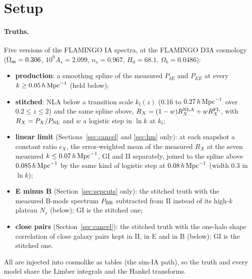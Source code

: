 \documentclass[11pt]{article}
\newcommand{\hMpc}{\,h\,{\rm Mpc}^{-1}}
\newcommand{\PNL}{P_{\rm NL}}
\newcommand{\PdE}{P_{\delta E}}
\newcommand{\PEE}{P_{EE}}
\newcommand{\Om}{\Omega_{\rm m}}
\begin{document}
\section{Setup}
\label{sec:setup}

\paragraph{Truths.}
Five versions of the FLAMINGO IA spectra, at the FLAMINGO D3A cosmology
($\Om = 0.306$, $10^9 A_s = 2.099$, $n_s = 0.967$, $H_0 = 68.1$, $\Omega_b =
0.0486$):
\begin{itemize}
  \item \textbf{production}: a smoothing spline of the measured $\PdE$ and
    $\PEE$ at every $k \ge 0.05\hMpc$ (held below);
  \item \textbf{stitched}: NLA below a transition scale $k_t(z)$ (0.16 to
    $0.27\hMpc$ over $0.2 \le z \le 2$) and the same spline above,
    $R_X = (1 - w) R_X^{\rm NLA} + w R_X^{\rm FL}$, with $R_X = P_X/\PNL$ and
    $w$ a logistic step in $\ln k$ at $k_t$;
  \item \textbf{linear limit} (Sections~\ref{sec:cancel} and \ref{sec:hm}
    only): at each snapshot a constant ratio $c_X$, the error-weighted mean
    of the measured $R_X$ at the seven measured $k \le 0.07\hMpc$, GI and II
    separately, joined to the spline above $0.085\hMpc$ by the same kind of
    logistic step at $0.08\hMpc$ (width 0.3 in $\ln k$);
  \item \textbf{E minus B} (Section~\ref{sec:sepcuts} only): the stitched
    truth with the measured B-mode spectrum $P_{\rm BB}$ subtracted from II
    instead of its high-$k$ plateau $N_s$ (below); GI is the stitched one;
  \item \textbf{close pairs} (Section~\ref{sec:cancel}): the stitched truth
    with the one-halo shape correlation of close galaxy pairs kept in II, in
    E and in B (below); GI is the stitched one.
\end{itemize}
All are injected into cosmolike as tables (the sim-IA path), so the truth
and every model share the Limber integrals and the Hankel transforms.
\end{document}
